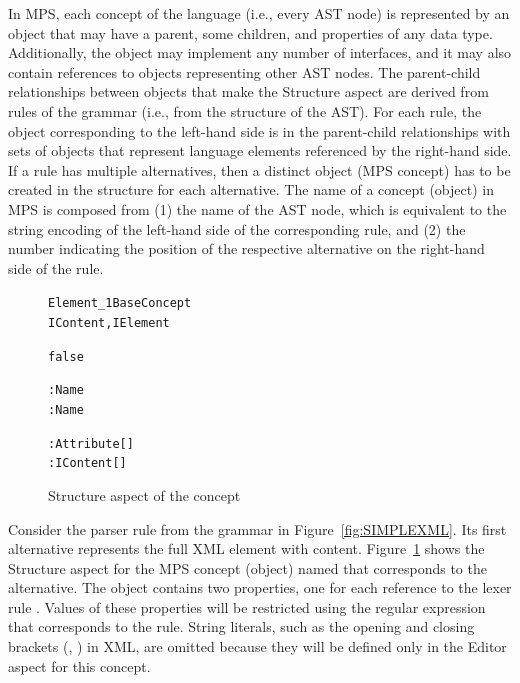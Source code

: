 In MPS, each concept of the language (i.e., every AST node) is represented by an object that may have a parent, some children, and properties of any data type.
Additionally, the object may implement any number of interfaces, and it may also contain references to objects representing other AST nodes.
The parent-child relationships between objects that make the Structure aspect are derived from rules of the grammar (i.e., from the structure of the AST).
For each rule, the object corresponding to the left-hand side is in the parent-child relationships with sets of objects that represent language elements referenced by the right-hand side.
If a rule has multiple alternatives, then a distinct object (MPS concept) has to be created in the structure for each alternative.
The name of a concept (object) in MPS is composed from (1) the name of the AST node, which is equivalent to the string encoding of the left-hand side of the corresponding rule, and (2) the number indicating the position of the respective alternative on the right-hand side of the rule.

\begin{figure}[ht]
\centering
\begin{alltt}
\small
{} Element\_1  BaseConcept
         IContent, IElement

   false
   \mpsstalias{< > </ >}
   

   : Name
   : Name
  
   : Attribute[]
     : IContent[]
\end{alltt}
\caption{Structure aspect of the  concept}
\label{fig:ELEMENTSTRUCT}
\end{figure}

Consider the parser rule  from the grammar in Figure~\ref{fig:SIMPLEXML}.
Its first alternative represents the full XML element with content.
Figure~\ref{fig:ELEMENTSTRUCT} shows the Structure aspect for the MPS concept (object) named  that corresponds to the alternative.
The object contains two properties, one for each reference to the lexer rule .
Values of these properties will be restricted using the regular expression that corresponds to the rule.
String literals, such as the opening and closing brackets (\antlrliteral{\textless}, \antlrliteral{/\textgreater}) in XML, are omitted because they will be defined only in the Editor aspect for this concept.

